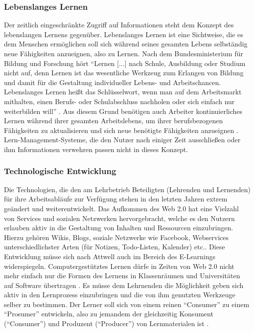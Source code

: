 \subsubsection{Lebenslanges Lernen}
Der zeitlich eingeschränkte Zugriff auf Informationen steht dem Konzept des lebenslangen Lernens gegenüber. Lebenslanges Lernen ist eine Sichtweise, die es dem Menschen ermöglichen soll sich während seines gesamten Lebens selbständig neue Fähigkeiten anzueignen, also zu Lernen. Nach dem Bundesministerium für Bildung und Forschung hört "`Lernen [...] nach Schule, Ausbildung oder Studium nicht auf, denn Lernen ist das wesentliche Werkzeug zum Erlangen von Bildung und damit für die Gestaltung individueller Lebens- und Arbeitschancen. Lebenslanges Lernen heißt das Schlüsselwort, wenn man auf dem Arbeitsmarkt mithalten, einen Berufs- oder Schulabschluss nachholen oder sich einfach nur weiterbilden will"' \cite{bmbf_lebenslanges_lernen}. Aus diesem Grund benötigen auch Arbeiter kontinuierliches Lernen während ihrer gesamten Arbeitslebens, um ihrer berufsbezogenen Fähigkeiten zu aktualisieren und sich neue benötigte Fähigkeiten anzueignen \cite{Attwell2007}. Lern-Management-Systeme, die den Nutzer nach einiger Zeit ausschließen oder ihm Informationen verwehren passen nicht in dieses Konzept.

\subsubsection{Technologische Entwicklung}\label{section:technologische_entwicklung}
Die Technologien, die den am Lehrbetrieb Beteiligten (Lehrenden und Lernenden) für ihre Arbeitsabläufe zur Verfügung stehen in den letzten Jahren extrem geändert und weiterentwickelt. Das Aufkommen des Web 2.0 hat eine Vielzahl von Services und sozialen Netzwerken hervorgebracht, welche es den Nutzern erlauben aktiv in die Gestaltung von Inhalten und Ressourcen einzubringen. Hierzu gehören Wikis, Blogs, soziale Netzwerke wie Facebook, Webservices unterschiedlichster Arten (für Notizen, Todo-Listen, Kalender) etc..
Diese Entwicklung müsse sich nach Attwell auch im Bereich des E-Learnings widerspiegeln. Computergestütztes Lernen dürfe in Zeiten von Web 2.0 nicht mehr einfach nur die Formen des Lernens in Klassenräumen und Universitäten auf Software übertragen \cite{Attwell2007}. Es müsse dem Lehrnenden die Möglichkeit geben sich aktiv in den Lernprozess einzubringen und die von ihm genutzten Werkzeuge selber zu bestimmen. Der Lerner soll sich von einem reinen "`Consumer"' zu einem "`Prosumer"' entwickeln, also zu jemandem der gleichzeitig Konsument ("`Consumer"') und Produzent ("`Producer"') von Lernmaterialen ist \cite{Schaffert2008a}.  

